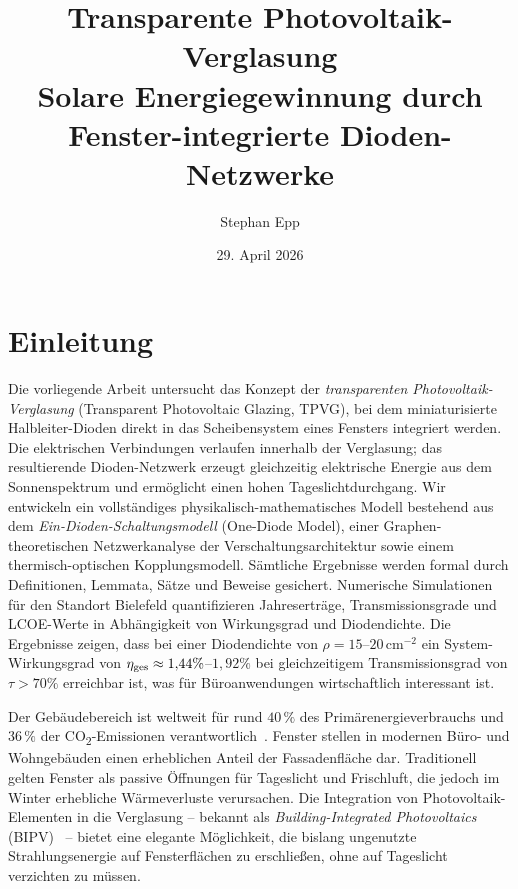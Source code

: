 ﻿\documentclass[a4paper,12pt]{article}
\title{%
  {\bfseries Transparente Photovoltaik-Verglasung}\\[-0.1em]
  {\large Solare Energiegewinnung durch Fenster-integrierte Dioden-Netzwerke}}
\author{Stephan Epp}
\date{29. April 2026}
\theoremstyle{definition}
\theoremstyle{remark}
\begin{document}

\maketitle
\tableofcontents
\newpage

\section{Einleitung}
\label{sec:einleitung}
Die vorliegende Arbeit untersucht das Konzept der \emph{transparenten
Photovoltaik-Verglasung} (Transparent Photovoltaic Glazing, TPVG), bei dem
miniaturisierte Halbleiter-Dioden direkt in das Scheibensystem eines Fensters
integriert werden. Die elektrischen Verbindungen verlaufen innerhalb der
Verglasung; das resultierende Dioden-Netzwerk erzeugt gleichzeitig elektrische
Energie aus dem Sonnenspektrum und ermöglicht einen hohen Tageslichtdurchgang.
Wir entwickeln ein vollständiges physikalisch-mathematisches Modell bestehend
aus dem \emph{Ein-Dioden-Schaltungsmodell} (One-Diode Model), einer
Graphen-theoretischen Netzwerkanalyse der Verschaltungsarchitektur sowie einem
thermisch-optischen Kopplungsmodell. Sämtliche Ergebnisse werden formal durch
Definitionen, Lemmata, Sätze und Beweise gesichert. Numerische Simulationen für
den Standort Bielefeld quantifizieren Jahreserträge, Transmissionsgrade und
LCOE-Werte in Abhängigkeit von Wirkungsgrad und Diodendichte. Die Ergebnisse
zeigen, dass bei einer Diodendichte von $\rho = 15$--$20\,\text{cm}^{-2}$ ein
System-Wirkungsgrad von $\eta_{\rm ges} \approx 1{,}44\%$--$1{,}92\%$ bei
gleichzeitigem Transmissionsgrad von $\tau > 70\%$ erreichbar ist, was für
Büroanwendungen wirtschaftlich interessant ist.

Der Gebäudebereich ist weltweit für rund $40\,\%$ des Primärenergieverbrauchs
und $36\,\%$ der CO\textsubscript{2}-Emissionen verantwortlich~\cite{IEA2023}. Fenster
stellen in modernen Büro- und Wohngebäuden einen erheblichen Anteil der
Fassadenfläche dar. Traditionell gelten Fenster als passive Öffnungen für
Tageslicht und Frischluft, die jedoch im Winter erhebliche Wärmeverluste
verursachen. Die Integration von Photovoltaik-Elementen in die Verglasung --
bekannt als \emph{Building-Integrated Photovoltaics} (BIPV)~\cite{Shukla2017}
-- bietet eine elegante Möglichkeit, die bislang ungenutzte Strahlungsenergie
auf Fensterflächen zu erschließen, ohne auf Tageslicht verzichten zu müssen.
\end{document}

